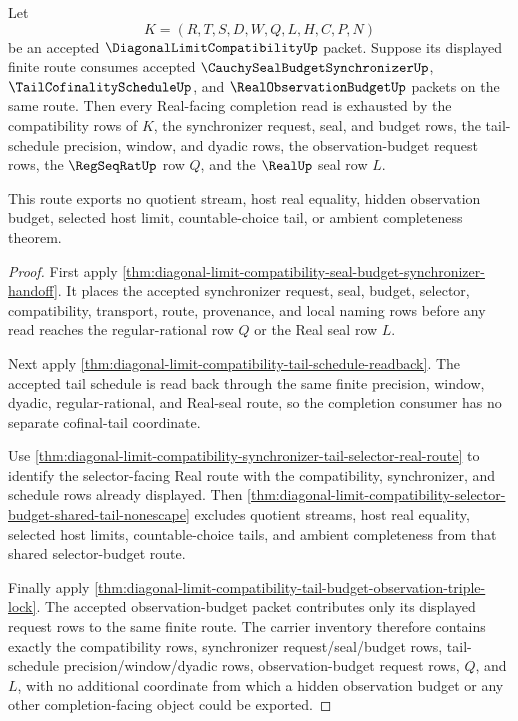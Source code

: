 \begin{theorem}
\label{thm:diagonal-limit-compatibility-triple-budget-route-exhaustion}
Let
$$
K=(R,T,S,D,W,Q,L,H,C,P,N)
$$
be an accepted $\DiagonalLimitCompatibilityUp$ packet. Suppose its displayed finite route consumes accepted $\CauchySealBudgetSynchronizerUp$, $\TailCofinalityScheduleUp$, and $\RealObservationBudgetUp$ packets on the same route. Then every Real-facing completion read is exhausted by the compatibility rows of $K$, the synchronizer request, seal, and budget rows, the tail-schedule precision, window, and dyadic rows, the observation-budget request rows, the $\RegSeqRatUp$ row $Q$, and the $\RealUp$ seal row $L$.

This route exports no quotient stream, host real equality, hidden observation budget, selected host limit, countable-choice tail, or ambient completeness theorem.
\end{theorem}
\begin{proof}
First apply \autoref{thm:diagonal-limit-compatibility-seal-budget-synchronizer-handoff}. It places the accepted synchronizer request, seal, budget, selector, compatibility, transport, route, provenance, and local naming rows before any read reaches the regular-rational row $Q$ or the Real seal row $L$.

Next apply \autoref{thm:diagonal-limit-compatibility-tail-schedule-readback}. The accepted tail schedule is read back through the same finite precision, window, dyadic, regular-rational, and Real-seal route, so the completion consumer has no separate cofinal-tail coordinate.

Use \autoref{thm:diagonal-limit-compatibility-synchronizer-tail-selector-real-route} to identify the selector-facing Real route with the compatibility, synchronizer, and schedule rows already displayed. Then \autoref{thm:diagonal-limit-compatibility-selector-budget-shared-tail-nonescape} excludes quotient streams, host real equality, selected host limits, countable-choice tails, and ambient completeness from that shared selector-budget route.

Finally apply \autoref{thm:diagonal-limit-compatibility-tail-budget-observation-triple-lock}. The accepted observation-budget packet contributes only its displayed request rows to the same finite route. The carrier inventory therefore contains exactly the compatibility rows, synchronizer request/seal/budget rows, tail-schedule precision/window/dyadic rows, observation-budget request rows, $Q$, and $L$, with no additional coordinate from which a hidden observation budget or any other completion-facing object could be exported.
\end{proof}

